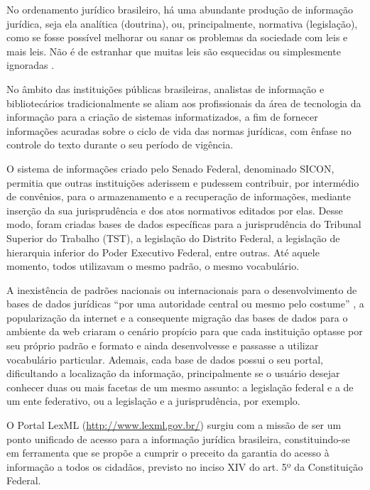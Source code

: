 \documentclass[a4paper,11pt,openright,twoside,brazil]{abntex2}
\begin{document}
\begin{citacao}
No ordenamento jurídico brasileiro, há uma abundante produção de informação
jurídica, seja ela analítica (doutrina), ou, principalmente, normativa
(legislação), como se fosse possível melhorar ou sanar os problemas da
sociedade com leis e mais leis. Não é de estranhar que muitas leis são
esquecidas ou simplesmente ignoradas \cite[p.~98]{passos2009}.
\end{citacao}

No âmbito das instituições públicas brasileiras, analistas de informação e
bibliotecários tradicionalmente se aliam aos profissionais da área de tecnologia
da informação para a criação de sistemas informatizados, a fim de fornecer
informações acuradas sobre o ciclo de vida das normas jurídicas, com ênfase no
controle do texto durante o seu período de vigência.

O sistema de informações criado pelo Senado Federal, denominado SICON, permitia
que outras instituições aderissem e pudessem contribuir, por intermédio de
convênios, para o armazenamento e a recuperação de informações, mediante
inserção da sua jurisprudência e dos atos normativos editados por elas. Desse
modo, foram criadas bases de dados específicas para a jurisprudência do Tribunal
Superior do Trabalho (TST), a legislação do Distrito Federal, a legislação de
hierarquia inferior do Poder Executivo Federal, entre outras. Até aquele
momento, todos utilizavam o mesmo padrão, o mesmo vocabulário.

A inexistência de padrões nacionais ou internacionais para o desenvolvimento de
bases de dados jurídicas ``por uma autoridade central ou mesmo pelo costume''
\cite[p.~60]{almeida-filho2005}, a popularização da internet e a consequente
migração das bases de dados para o ambiente da web criaram o cenário propício
para que cada instituição optasse por seu próprio padrão e formato e ainda
desenvolvesse e passasse a utilizar vocabulário particular. Ademais, cada base
de dados possui o seu portal, dificultando a localização da informação,
principalmente se o usuário desejar conhecer duas ou mais facetas de um mesmo
assunto: a legislação federal e a de um ente federativo, ou a legislação e a
jurisprudência, por exemplo.

O Portal LexML (\url{http://www.lexml.gov.br/}) surgiu com a missão de ser um
ponto unificado de acesso para a informação jurídica brasileira, constituindo-se em
ferramenta que se propõe a cumprir o preceito da garantia do acesso à informação
a todos os cidadãos, previsto no inciso XIV do art. 5º da Constituição Federal.
\end{document}
